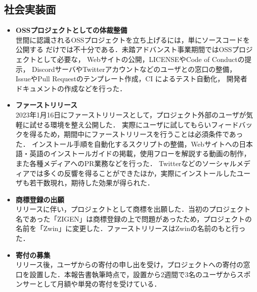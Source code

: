 \subsection{社会実装面}

\begin{itemize}
      \item \textbf{OSSプロジェクトとしての体裁整備} \\
            世間に認識されるOSSプロジェクトを立ち上げるには，単にソースコードを公開する
            だけでは不十分である．未踏アドバンスト事業期間ではOSSプロジェクトとして必要な，
            Webサイトの公開，LICENSEやCode of Conductの提示，
            DiscordサーバやTwitterアカウントなどのユーザとの窓口の整備，
            IssueやPull Requestのテンプレート作成，CI によるテスト自動化，
            開発者ドキュメントの作成などを行った．
      \item \textbf{ファーストリリース} \\
            2023年1月16日にファーストリリースとして，プロジェクト外部のユーザが気軽に試せる環境を整え公開した．
            実際にユーザに試してもらいフィードバックを得るため，期間中にファーストリリースを行うことは必須条件であった．
            インストール手順を自動化するスクリプトの整備，Webサイトへの日本語・英語のインストールガイドの掲載，使用フローを解説する動画の制作，また各種メディアへのPR業務などを行った．
            Twitterなどのソーシャルメディアでは多くの反響を得ることができたほか，実際にインストールしたユーザも若干数現れ，期待した効果が得られた．
      \item \textbf{商標登録の出願} \\
            リリースに伴い，プロジェクトとして商標を出願した．当初のプロジェクト名であった「ZIGEN」は商標登録の上で問題があったため，プロジェクトの名前を「Zwin」に変更した．ファーストリリースはZwinの名前のもと行った．
      \item \textbf{寄付の募集} \\
            リリース後，ユーザからの寄付の申し出を受け，プロジェクトへの寄付の窓口を設置した．本報告書執筆時点で，設置から2週間で3名のユーザからスポンサーとして月額や単発の寄付を受けている．
\end{itemize}
